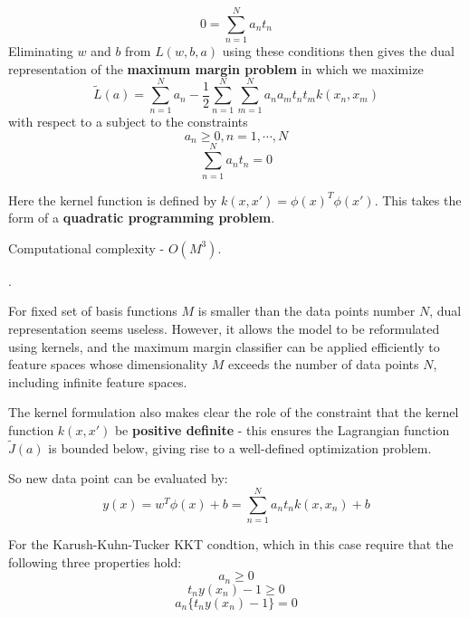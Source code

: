 \documentclass[twoside]{article}
\begin{document}
\begin{equation}
0 = \sum_{n=1}^{N}a_nt_n
\end{equation}
Eliminating $w$ and $b$ from $L(w, b, a)$ using these conditions then gives the dual representation of the \textbf{maximum margin problem} in which we maximize
\begin{equation}
\tilde{L}(a) = \sum_{n=1}^{N}a_n - \frac{1}{2}\sum_{n=1}^{N}\sum_{m=1}^{N} a_na_mt_nt_mk(x_n,x_m)
\end{equation}
with respect to a subject to the constraints
\begin{equation}
a_n \geq 0,n = 1,\cdots,N
\end{equation}
\begin{equation}
\sum_{n=1}^{N}  a_nt_n = 0
\end{equation}

Here the kernel function is defined by $k(x, x')=\phi(x)^T\phi(x')$. This takes the form of a \textbf{quadratic programming problem}.

Computational complexity - $O(M^3)$.

{\color{red}{With dual formulation, the original optimization problem involved minimizing over $M$ variables into the dual problem with $N$ variables}}.

For fixed set of basis functions $M$ is smaller than the data points number $N$, dual representation seems useless.
However, it allows the model to be reformulated using kernels, and the maximum margin classifier can be applied efficiently to feature spaces whose dimensionality $M$ exceeds the number of data points $N$, including infinite feature spaces.

The kernel formulation also makes clear the role of the constraint that the kernel function $k(x, x')$ be \textbf{positive definite} - this ensures the Lagrangian function $\tilde{J}(a)$ is bounded below, giving rise to a well-defined optimization problem.

So new data point can be evaluated by:
\begin{equation}
y(x) = w^T\phi(x)+b = \sum_{n=1}^{N} a_n t_n k(x, x_n)+b
\end{equation}

For the Karush-Kuhn-Tucker KKT condtion, which in this case require that the following three properties hold:
\begin{equation}
a_n\geq0
\end{equation}
\begin{equation}
t_ny(x_n) - 1 \geq 0
\end{equation}
\begin{equation}
a_n\{t_n y(x_n)-1\} = 0
\end{equation}
\end{document}
